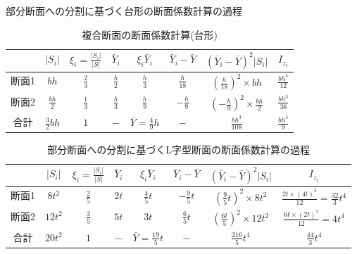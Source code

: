 ﻿\documentclass[10pt,a4j]{jbook}
\begin{document}
\begin{table}
\begin{center}
	\caption{部分断面への分割に基づく台形の断面係数計算の過程}
	\caption{複合断面の断面係数計算(台形)}
	\begin{tabular}{c||c|c|c|c|c|c|c}
		&
		$\left| S_i \right|$ & 
		$ \xi_i=\frac{\left| S_i \right|}{\left| S\right|} $  &
		$ \bar{Y}_i $ & 
		$ \xi_i\bar{Y}_i $ & 
		$\bar{Y}_i -\bar Y$ & 
		$ \left(\bar{Y}_i -\bar Y\right)^2\left| S_i \right|$ & 
		$ I_{z_i}$  
		\\
		\hline 
		断面1&	
		$bh$ & 
		$\frac{2}{3}$  &
		$\frac{h}{2}$ & 
		$\frac{h}{3}$ & 
		$\frac{h}{18}$ & 
		$\left(\frac{h}{18}\right)^2 \times bh $ & 
		$\frac{bh^3}{12}$  
		\\
		\hline
		断面2&	
		$\frac{bh}{2}$ & 
		$\frac{1}{3}$  &
		$\frac{h}{3}$ & 
		$\frac{h}{9}$ & 
		$-\frac{h}{9}$ & 
		$\left(-\frac{h}{9}\right)^2 \times \frac{bh}{2}$ & 
		$\frac{bh^3}{36}$  
		\\
		\hline 
		合計&	
		$\frac{3}{2}bh$ & 
		$1$  &
		$-$ & 
		$\bar Y=\frac{4}{9}h$ & 
		$-$ & 
		$\frac{bh^3}{108}$ & 
		$\frac{bh^3}{9}$ 
	\end{tabular}
	\label{tbl1}
\end{center}
\end{table}
\begin{table}
\begin{center}
	\caption{部分断面への分割に基づくL字型断面の断面係数計算の過程}
	\begin{tabular}{c||c|c|c|c|c|c|c}
		&
		$\left| S_i \right|$ & 
		$ \xi_i=\frac{\left| S_i \right|}{\left| S\right|} $  &
		$ \bar{Y}_i $ & 
		$ \xi_i\bar{Y}_i $ & 
		$\bar{Y}_i -\bar Y$ & 
		$ \left(\bar{Y}_i -\bar Y\right)^2\left| S_i \right|$ & 
		$ I_{z_i}$  
		\\
		\hline 
		断面1&	
		$8t^2$ & 
		$\frac{2}{5}$  &
		$2t$ & 
		$\frac{4}{5}t$ & 
		$-\frac{9}{5}t$ & 
		$\left(\frac{9}{5}t\right)^2 \times 8t^2 $ & 
		$\frac{2t\times (4t)^3}{12}=\frac{32}{3}t^4$  
		\\
		\hline
		断面2&	
		$12t^2$ & 
		$\frac{3}{5}$  &
		$5t$ & 
		$3t $ & 
		$\frac{6}{5}t$ & 
		$\left(\frac{6t}{5}\right)^2 \times 12t^2 $ & 
		$\frac{6t\times (2t)^3}{12}=4t^4$  
		\\
		\hline 
		合計&	
		$20t^2$ & 
		$1$  &
		$-$ & 
		$\bar Y=\frac{19}{5}t$ & 
		$-$ & 
		$\frac{216}{5}t^4$ & 
		$\frac{44}{3}t^4$ 
	\end{tabular}
\label{tbl2}
\end{center}
\end{table}
\end{document}
